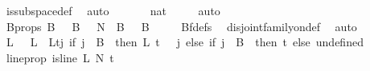 \begin{isabellebody}
\ is{\isacharunderscore}{\kern0pt}subspace{\isacharunderscore}{\kern0pt}def\ \isamarkupfalse%
\ auto\ \isanewline
\isanewline
\ \ \ \ \isamarkupfalse%
\ {\isachardoublequoteopen}{\isacharbraceleft}{\kern0pt}{\isachardot}{\kern0pt}{\isachardot}{\kern0pt}{}{\isacharcolon}{\kern0pt}{\isacharcolon}{\kern0pt}nat{\isacharbraceright}{\kern0pt}\ {\isacharequal}{\kern0pt}\ {\isacharbraceleft}{\kern0pt}{}{\isacharcomma}{\kern0pt}\ {}{\isacharbraceright}{\kern0pt}{\isachardoublequoteclose}\ \isamarkupfalse%
\ auto\isanewline
\ \ \ \ \isamarkupfalse%
\ \isamarkupfalse%
\ B{\isacharunderscore}{\kern0pt}props{\isacharcolon}{\kern0pt}\ {\isachardoublequoteopen}B\ {}\ {\isasymunion}\ B\ {}\ {\isacharequal}{\kern0pt}\ {\isacharbraceleft}{\kern0pt}{\isachardot}{\kern0pt}{\isachardot}{\kern0pt}{\isacharless}{\kern0pt}N{\isacharprime}{\kern0pt}{\isacharbraceright}{\kern0pt}\ {\isasymand}\ {\isacharparenleft}{\kern0pt}B\ {}\ {\isasyminter}\ B\ {}\ {\isacharequal}{\kern0pt}\ {\isacharbraceleft}{\kern0pt}{\isacharbraceright}{\kern0pt}{\isacharparenright}{\kern0pt}{\isachardoublequoteclose}\ \isamarkupfalse%
\ Bf{\isacharunderscore}{\kern0pt}defs\ \isamarkupfalse%
\ disjoint{\isacharunderscore}{\kern0pt}family{\isacharunderscore}{\kern0pt}on{\isacharunderscore}{\kern0pt}def\ \isamarkupfalse%
\ auto\isanewline
\ \ \ \ \isamarkupfalse%
\ L{\isacharprime}{\kern0pt}\ \ \ {\isachardoublequoteopen}L{\isacharprime}{\kern0pt}\ {\isasymequiv}\ L{\isacharparenleft}{\kern0pt}t{\isacharcolon}{\kern0pt}{\isacharequal}{\kern0pt}{\isacharparenleft}{\kern0pt}{\isasymlambda}j{\isachardot}{\kern0pt}\ if\ j\ {\isasymin}\ B\ {}\ then\ L\ {\isacharparenleft}{\kern0pt}t\ {\isacharminus}{\kern0pt}\ {}{\isacharparenright}{\kern0pt}\ j\ else\ {\isacharparenleft}{\kern0pt}if\ j\ {\isasymin}\ B\ {}\ then\ t\ else\ undefined{\isacharparenright}{\kern0pt}{\isacharparenright}{\kern0pt}{\isacharparenright}{\kern0pt}{\isachardoublequoteclose}\ \isanewline
\ \ \ \ \isamarkupfalse%
\ line{\isacharunderscore}{\kern0pt}prop{\isacharcolon}{\kern0pt}\ {\isachardoublequoteopen}is{\isacharunderscore}{\kern0pt}line\ L{\isacharprime}{\kern0pt}\ N{\isacharprime}{\kern0pt}\ {\isacharparenleft}{\kern0pt}t\ {\isacharplus}{\kern0pt}\ {}{\isacharparenright}{\kern0pt}{\isachardoublequoteclose}\isanewline
\ \ \ \ \isamarkupfalse%

\end{isabellebody}
